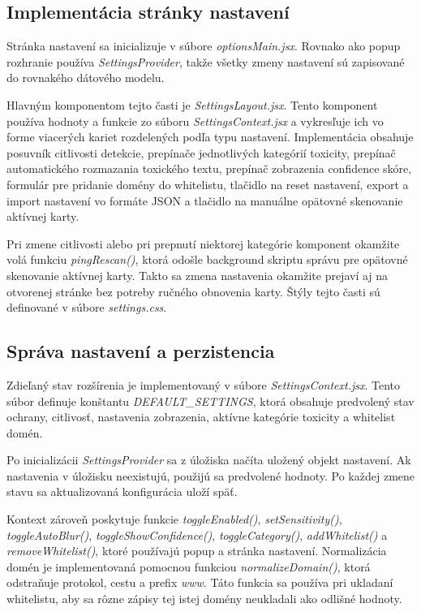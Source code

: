 \subsection{Implementácia stránky nastavení}
Stránka nastavení sa inicializuje v súbore \emph{optionsMain.jsx}. Rovnako ako popup rozhranie používa \emph{SettingsProvider}, takže všetky zmeny nastavení sú zapisované do rovnakého dátového modelu.

Hlavným komponentom tejto časti je \emph{SettingsLayout.jsx}. Tento komponent používa hodnoty a funkcie zo súboru \emph{SettingsContext.jsx} a vykresľuje ich vo forme viacerých kariet rozdelených podľa typu nastavení. Implementácia obsahuje posuvník citlivosti detekcie, prepínače jednotlivých kategórií toxicity, prepínač automatického rozmazania toxického textu, prepínač zobrazenia confidence skóre, formulár pre pridanie domény do whitelistu, tlačidlo na reset nastavení, export a import nastavení vo formáte JSON a tlačidlo na manuálne opätovné skenovanie aktívnej karty.

Pri zmene citlivosti alebo pri prepnutí niektorej kategórie komponent okamžite volá funkciu \emph{pingRescan()}, ktorá odošle background skriptu správu pre opätovné skenovanie aktívnej karty. Takto sa zmena nastavenia okamžite prejaví aj na otvorenej stránke bez potreby ručného obnovenia karty. Štýly tejto časti sú definované v súbore \emph{settings.css}.

\subsection{Správa nastavení a perzistencia}
Zdieľaný stav rozšírenia je implementovaný v súbore \emph{SettingsContext.jsx}. Tento súbor definuje konštantu \emph{DEFAULT\_SETTINGS}, ktorá obsahuje predvolený stav ochrany, citlivosť, nastavenia zobrazenia, aktívne kategórie toxicity a whitelist domén.

Po inicializácii \emph{SettingsProvider} sa z úložiska načíta uložený objekt nastavení. Ak nastavenia v úložisku neexistujú, použijú sa predvolené hodnoty. Po každej zmene stavu sa aktualizovaná konfigurácia uloží späť.

Kontext zároveň poskytuje funkcie \emph{toggleEnabled()}, \emph{setSensitivity()}, \emph{toggleAutoBlur()}, \emph{toggleShowConfidence()}, \emph{toggleCategory()}, \emph{addWhitelist()} a \emph{removeWhitelist()}, ktoré používajú popup a stránka nastavení. Normalizácia domén je implementovaná pomocnou funkciou \emph{normalizeDomain()}, ktorá odstraňuje protokol, cestu a prefix \emph{www}. Táto funkcia sa používa pri ukladaní whitelistu, aby sa rôzne zápisy tej istej domény neukladali ako odlišné hodnoty.

